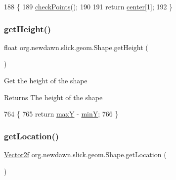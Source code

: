 \begin{DoxyCode}
188                               \{
189         \mbox{\hyperlink{classorg_1_1newdawn_1_1slick_1_1geom_1_1_shape_a84293802d05e8666a441720bfc12745d}{checkPoints}}();
190         
191         \textcolor{keywordflow}{return} \mbox{\hyperlink{classorg_1_1newdawn_1_1slick_1_1geom_1_1_shape_a15ecde3336c4310cd927d766bb9a0b3b}{center}}[1];
192     \}
\end{DoxyCode}
\mbox{\label{classorg_1_1newdawn_1_1slick_1_1geom_1_1_shape_a13854472f74dc780d8f45411efbb10bf}} 
\subsubsection{\texorpdfstring{get\+Height()}{getHeight()}}
{\footnotesize\ttfamily float org.\+newdawn.\+slick.\+geom.\+Shape.\+get\+Height (\begin{DoxyParamCaption}{ }\end{DoxyParamCaption})\hspace{0.3cm}{\ttfamily [inline]}}

Get the height of the shape

\begin{DoxyReturn}{Returns}
The height of the shape 
\end{DoxyReturn}

\begin{DoxyCode}
764                              \{
765         \textcolor{keywordflow}{return} \mbox{\hyperlink{classorg_1_1newdawn_1_1slick_1_1geom_1_1_shape_aaacbabfb1b7d0653f59658d92ded1c2b}{maxY}} - \mbox{\hyperlink{classorg_1_1newdawn_1_1slick_1_1geom_1_1_shape_a4794592d5238a8c51d9d8ac4a11e68d4}{minY}};
766     \}
\end{DoxyCode}
\mbox{\label{classorg_1_1newdawn_1_1slick_1_1geom_1_1_shape_a2684b748f3637b2095ec56e46403e5e1}} 
\subsubsection{\texorpdfstring{get\+Location()}{getLocation()}}
{\footnotesize\ttfamily \mbox{\hyperlink{classorg_1_1newdawn_1_1slick_1_1geom_1_1_vector2f}{Vector2f}} org.\+newdawn.\+slick.\+geom.\+Shape.\+get\+Location (\begin{DoxyParamCaption}{ }\end{DoxyParamCaption})\hspace{0.3cm}{\ttfamily [inline]}}

